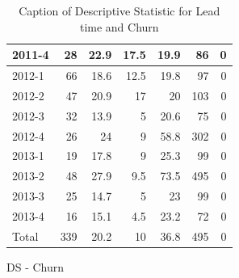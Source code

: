 \documentclass[UKenglish]{ifimaster}  %
\begin{document}
\begin{appendices}
\begin{table}[!htbp]
\begin{adjustwidth}{-2.5cm}{}
\begin{subfigure}[b]{0.3\textwidth}
{\begin{tabular}{ | l | r | r | r | r | r | r | }
 2011-4  & 28 & 22.9 & 17.5 & 19.9 & 86 & 0\\ \hline
 2012-1  & 66 & 18.6 & 12.5 & 19.8 & 97 & 0\\ \hline
 2012-2  & 47 & 20.9 & 17 & 20 & 103 & 0\\ \hline
 2012-3  & 32 & 13.9 & 5 & 20.6 & 75 & 0\\ \hline
 2012-4  & 26 & 24 & 9 & 58.8 & 302 & 0\\ \hline
 2013-1  & 19 & 17.8 & 9 & 25.3 & 99 & 0\\ \hline
 2013-2  & 48 & 27.9 & 9.5 & 73.5 & 495 & 0\\ \hline
 2013-3  & 25 & 14.7 & 5 & 23 & 99 & 0\\ \hline
 2013-4  & 16 & 15.1 & 4.5 & 23.2 & 72 & 0\\ \hline
 Total  & 339 & 20.2 & 10 & 36.8 & 495 & 0\\ \hline
\end{tabular}
}
\caption{DS - Churn}
 \label{DS:Churn:1}
\end{subfigure}
\end{adjustwidth}
\caption[Optional caption for list of figures]{Caption of Descriptive Statistic for Lead time and Churn}
\label{DS:1:3} %
\end{table}


\end{appendices}
\end{document}
